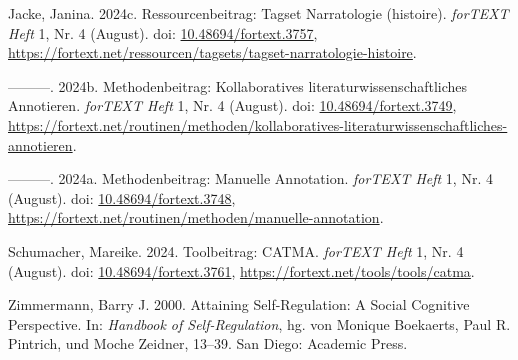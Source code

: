 \documentclass[
          a4paper,
        ]{article}
\newlength{\cslhangindent}
\newenvironment{CSLReferences}[2] %
 {\begin{list}{}{%
  \setlength{\itemindent}{0pt}
  \setlength{\leftmargin}{0pt}
  \setlength{\parsep}{0pt}
  \ifodd #1
   \setlength{\leftmargin}{\cslhangindent}
   \setlength{\itemindent}{-1\cslhangindent}
  \fi
  \setlength{\itemsep}{#2\baselineskip}}}
 {\end{list}}
\begin{document}
\begin{CSLReferences}{1}{0}
Jacke, Janina. 2024c. Ressourcenbeitrag: {Tagset} {Narratologie}
(histoire). \emph{forTEXT Heft} 1, Nr. 4 (August). doi:
\href{https://doi.org/10.48694/fortext.3757}{10.48694/fortext.3757},
\url{https://fortext.net/ressourcen/tagsets/tagset-narratologie-histoire}.

---------. 2024b. Methodenbeitrag: {Kollaboratives}
literaturwissenschaftliches {Annotieren}. \emph{forTEXT Heft} 1, Nr. 4
(August). doi:
\href{https://doi.org/10.48694/fortext.3749}{10.48694/fortext.3749},
\url{https://fortext.net/routinen/methoden/kollaboratives-literaturwissenschaftliches-annotieren}.

---------. 2024a. Methodenbeitrag: {Manuelle} {Annotation}.
\emph{forTEXT Heft} 1, Nr. 4 (August). doi:
\href{https://doi.org/10.48694/fortext.3748}{10.48694/fortext.3748},
\url{https://fortext.net/routinen/methoden/manuelle-annotation}.

Schumacher, Mareike. 2024. Toolbeitrag: {CATMA}. \emph{forTEXT Heft} 1,
Nr. 4 (August). doi:
\href{https://doi.org/10.48694/fortext.3761}{10.48694/fortext.3761},
\url{https://fortext.net/tools/tools/catma}.

Zimmermann, Barry J. 2000. Attaining Self-Regulation: A Social Cognitive
Perspective. In: \emph{Handbook of Self-Regulation}, hg. von Monique
Boekaerts, Paul R. Pintrich, und Moche Zeidner, 13--39. San Diego:
Academic Press.

\end{CSLReferences}
\end{document}
